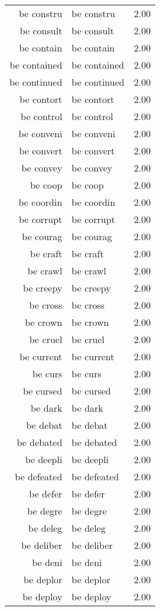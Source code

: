 \begin{table}[ht]
\begin{tabular}{rlr}
  be constru & be constru & 2.00 \\ 
  be consult & be consult & 2.00 \\ 
  be contain & be contain & 2.00 \\ 
  be contained & be contained & 2.00 \\ 
  be continued & be continued & 2.00 \\ 
  be contort & be contort & 2.00 \\ 
  be control & be control & 2.00 \\ 
  be conveni & be conveni & 2.00 \\ 
  be convert & be convert & 2.00 \\ 
  be convey & be convey & 2.00 \\ 
  be coop & be coop & 2.00 \\ 
  be coordin & be coordin & 2.00 \\ 
  be corrupt & be corrupt & 2.00 \\ 
  be courag & be courag & 2.00 \\ 
  be craft & be craft & 2.00 \\ 
  be crawl & be crawl & 2.00 \\ 
  be creepy & be creepy & 2.00 \\ 
  be cross & be cross & 2.00 \\ 
  be crown & be crown & 2.00 \\ 
  be cruel & be cruel & 2.00 \\ 
  be current & be current & 2.00 \\ 
  be curs & be curs & 2.00 \\ 
  be cursed & be cursed & 2.00 \\ 
  be dark & be dark & 2.00 \\ 
  be debat & be debat & 2.00 \\ 
  be debated & be debated & 2.00 \\ 
  be deepli & be deepli & 2.00 \\ 
  be defeated & be defeated & 2.00 \\ 
  be defer & be defer & 2.00 \\ 
  be degre & be degre & 2.00 \\ 
  be deleg & be deleg & 2.00 \\ 
  be deliber & be deliber & 2.00 \\ 
  be deni & be deni & 2.00 \\ 
  be deplor & be deplor & 2.00 \\ 
  be deploy & be deploy & 2.00 \\ 

\end{tabular}
\end{table}
